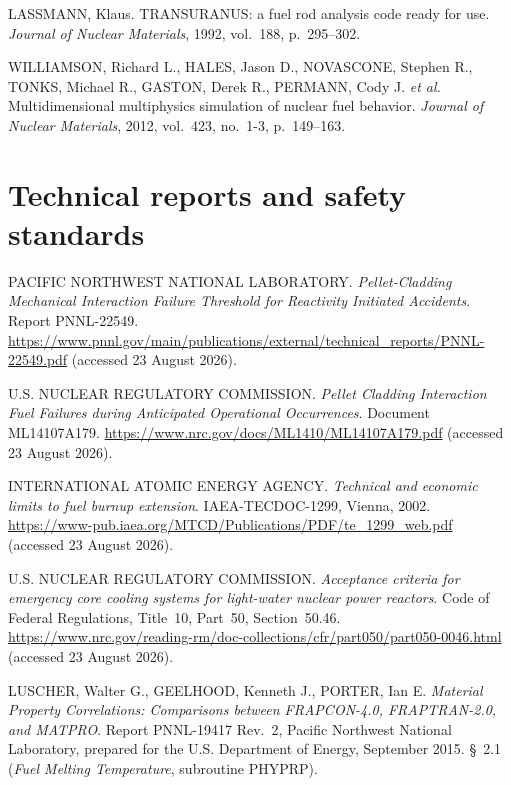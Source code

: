 \documentclass[12pt,a4paper]{report}
\begin{document}
\begin{list}{}{\setlength{\leftmargin}{1cm}\setlength{\itemindent}{-1cm}}
\item[{[5]}]
LASSMANN, Klaus.
TRANSURANUS: a fuel rod analysis code ready for use.
\textit{Journal of Nuclear Materials}, 1992, vol.~188, p.~295--302.

\item[{[6]}]
WILLIAMSON, Richard L., HALES, Jason D., NOVASCONE, Stephen R.,
TONKS, Michael R., GASTON, Derek R., PERMANN, Cody J. \textit{et al.}
Multidimensional multiphysics simulation of nuclear fuel behavior.
\textit{Journal of Nuclear Materials}, 2012, vol.~423, no.~1-3, p.~149--163.

\end{list}

\section*{Technical reports and safety standards}

\begin{list}{}{\setlength{\leftmargin}{1cm}\setlength{\itemindent}{-1cm}}

\item[{[7]}]
PACIFIC NORTHWEST NATIONAL LABORATORY.
\textit{Pellet-Cladding Mechanical Interaction Failure Threshold for Reactivity
Initiated Accidents}. Report PNNL-22549.
\url{https://www.pnnl.gov/main/publications/external/technical_reports/PNNL-22549.pdf}
(accessed 23 August 2026).

\item[{[8]}]
U.S. NUCLEAR REGULATORY COMMISSION.
\textit{Pellet Cladding Interaction Fuel Failures during Anticipated
Operational Occurrences}. Document ML14107A179.
\url{https://www.nrc.gov/docs/ML1410/ML14107A179.pdf}
(accessed 23 August 2026).

\item[{[9]}]
INTERNATIONAL ATOMIC ENERGY AGENCY.
\textit{Technical and economic limits to fuel burnup extension}.
IAEA-TECDOC-1299, Vienna, 2002.
\url{https://www-pub.iaea.org/MTCD/Publications/PDF/te_1299_web.pdf}
(accessed 23 August 2026).

\item[{[10]}]
U.S. NUCLEAR REGULATORY COMMISSION.
\textit{Acceptance criteria for emergency core cooling systems for light-water
nuclear power reactors}. Code of Federal Regulations, Title~10, Part~50,
Section~50.46.
\url{https://www.nrc.gov/reading-rm/doc-collections/cfr/part050/part050-0046.html}
(accessed 23 August 2026).

\item[{[11]}]
LUSCHER, Walter G., GEELHOOD, Kenneth J., PORTER, Ian E.
\textit{Material Property Correlations: Comparisons between FRAPCON-4.0,
FRAPTRAN-2.0, and MATPRO}. Report PNNL-19417 Rev.~2, Pacific Northwest
National Laboratory, prepared for the U.S. Department of Energy, September 2015.
\S~2.1 (\textit{Fuel Melting Temperature}, subroutine PHYPRP).

\end{list}
\end{document}
